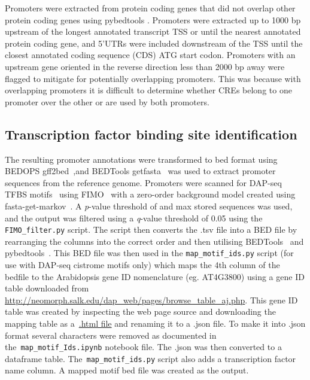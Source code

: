 Promoters were extracted from protein coding genes that did not overlap other protein coding genes using pybedtools \autocite{dalePybedtoolsFlexiblePython2011}.
Promoters were extracted up to 1000 bp upstream of the longest annotated transcript TSS or until the nearest annotated protein coding gene, and 5'UTRs were included downstream of the TSS until the closest annotated coding sequence (CDS) ATG start codon.
Promoters with an upstream gene oriented in the reverse direction less than 2000 bp away were flagged to mitigate for potentially overlapping promoters.
This was because with overlapping promoters it is difficult to determine whether CREs belong to one promoter over the other or are used by both promoters.

\subsection{Transcription factor binding site identification}
\label{transcription-factor-binding-site-identification}

The resulting promoter annotations were transformed to bed format using BEDOPS gff2bed~\autocite{nephBEDOPSHighperformanceGenomic2012},and BEDTools getfasta~\autocite{quinlanBEDToolsFlexibleSuite2010} was used to extract promoter sequences from the reference genome.
Promoters were scanned for DAP\hyp{}seq TFBS motifs~\autocite{omalleyCistromeEpicistromeFeatures2016} using FIMO~\autocite{grantFIMOScanningOccurrences2011} with a zero\hyp{}order background model created using fasta\hyp{}get\hyp{}markov~\autocite{baileyMEMESuiteTools2009}.
A \textit{p}-value threshold of  and max stored sequences  was used, and the output was filtered using a \textit{q}\hyp{}value threshold of 0.05 using the \texttt{FIMO\_filter.py} script.
The script then converts the .tsv file into a BED file by rearranging the columns into the correct order and then utilising BEDTools~\autocite{quinlanBEDToolsFlexibleSuite2010} and pybedtools~\autocite{dalePybedtoolsFlexiblePython2011}.
This BED file was then used in the \texttt{map\_motif\_ids.py} script (for use with DAP\hyp{}seq cistrome motifs only) which maps the 4th column of the bedfile to the Arabidopsis gene ID nomenclature (eg. AT4G3800) using a gene ID table downloaded from \url{http://neomorph.salk.edu/dap\_web/pages/browse\_table\_aj.php}.
This gene ID table was created by inspecting the web page source and
downloading the mapping table as
a~\href{http://neomorph.salk.edu/dev/pages/shhuang/dap_web/pages/dap-grid-data3.php?_=1573587374712}{.html
	file} and renaming it to a .json file. To make it into .json format
several characters were removed as documented in the~\texttt{map\_motif\_Ids.ipynb} notebook file. The .json was then converted to a
dataframe table. The~\texttt{map\_motif\_ids.py} script also adds a
transcription factor name column. A mapped motif bed file was created as
the output.


